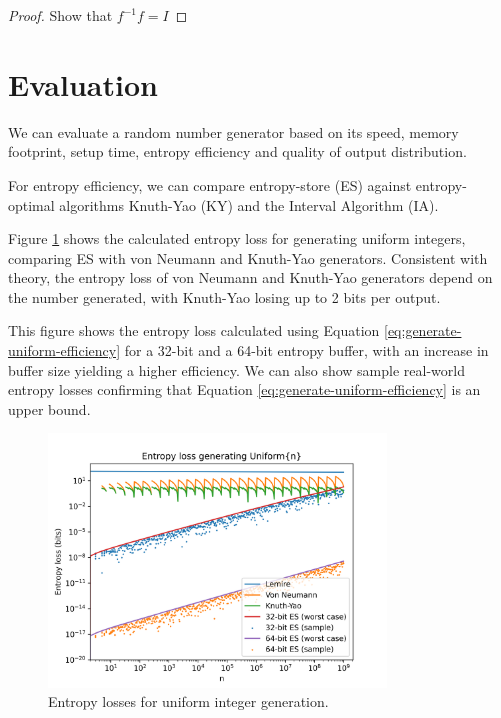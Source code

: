\documentclass[12pt]{article}
\begin{document}
\begin{proof}
    Show that $f^{-1}f= I$

\end{proof}




\section {Evaluation}

We can evaluate a random number generator based on its speed, memory footprint, setup time, entropy efficiency and quality of output distribution. \cite{saad2025}

For entropy efficiency, we can compare entropy-store (ES) against entropy-optimal algorithms Knuth-Yao (KY) and the Interval Algorithm (IA).

Figure \ref{fig:uniform-losses} shows the calculated entropy loss for generating uniform integers, comparing ES with von Neumann and Knuth-Yao generators. Consistent with theory, the entropy loss of von Neumann and Knuth-Yao generators depend on the number generated, with Knuth-Yao losing up to 2 bits per output.

This figure shows the entropy loss calculated using Equation \ref{eq:generate-uniform-efficiency} for a 32-bit and a 64-bit entropy buffer, with an increase in buffer size yielding a higher efficiency. We can also show sample real-world entropy losses confirming that Equation \ref{eq:generate-uniform-efficiency} is an upper bound.

\begin{figure}[ht]
\centering
\includegraphics[width=0.8\textwidth]{uniform_losses.png}
\caption{Entropy losses for uniform integer generation.}
\label{fig:uniform-losses}
\end{figure}
\end{document}
